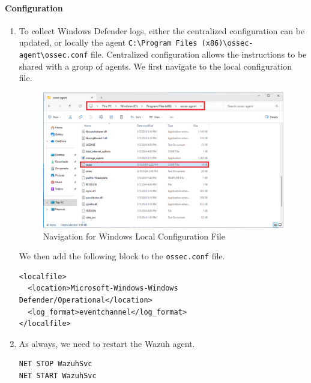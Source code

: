 \paragraph{Configuration}
\begin{enumerate}
    \item To collect Windows Defender logs, either the centralized configuration can be updated, or locally the agent \texttt{C:\textbackslash Program Files (x86)\textbackslash ossec-agent\textbackslash ossec.conf} file. Centralized configuration allows the instructions to be shared with a group of agents.
    We first navigate to the local configuration file.
    \begin{figure}[H]
        \centering
        \includegraphics[width=\textwidth]{images/malware-detection/windows-log/1.png}
        \caption{Navigation for Windows Local Configuration File}
        \label{fig:win-conf-navigate}
    \end{figure}
    We then add the following block to the \texttt{ossec.conf} file.
    \begin{verbatim}
<localfile>
  <location>Microsoft-Windows-Windows Defender/Operational</location>
  <log_format>eventchannel</log_format>
</localfile>
    \end{verbatim}

    \item As always, we need to restart the Wazuh agent.
    \begin{verbatim}
NET STOP WazuhSvc
NET START WazuhSvc
    \end{verbatim}
\end{enumerate}

